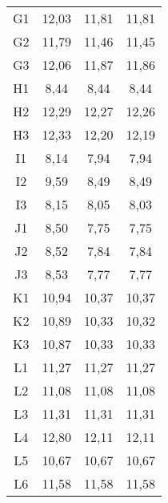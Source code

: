 \begin{center}
\begin{longtable}{cccc}
G1    & 12,03 & 11,81 & 11,81 \\
G2    & 11,79 & 11,46 & 11,45 \\
G3    & 12,06 & 11,87 & 11,86 \\
H1    & 8,44  & 8,44  & 8,44 \\
H2    & 12,29 & 12,27 & 12,26 \\
H3    & 12,33 & 12,20 & 12,19 \\
I1    & 8,14  & 7,94  & 7,94 \\
I2    & 9,59  & 8,49  & 8,49 \\
I3    & 8,15  & 8,05  & 8,03 \\
J1    & 8,50  & 7,75  & 7,75 \\
J2    & 8,52  & 7,84  & 7,84 \\
J3    & 8,53  & 7,77  & 7,77 \\
K1    & 10,94 & 10,37 & 10,37 \\
K2    & 10,89 & 10,33 & 10,32 \\
K3    & 10,87 & 10,33 & 10,33 \\
L1    & 11,27 & 11,27 & 11,27 \\
L2    & 11,08 & 11,08 & 11,08 \\
L3    & 11,31 & 11,31 & 11,31 \\
L4    & 12,80 & 12,11 & 12,11 \\
L5    & 10,67 & 10,67 & 10,67 \\
L6    & 11,58 & 11,58 & 11,58 \\


\end{longtable}
\end{center}

